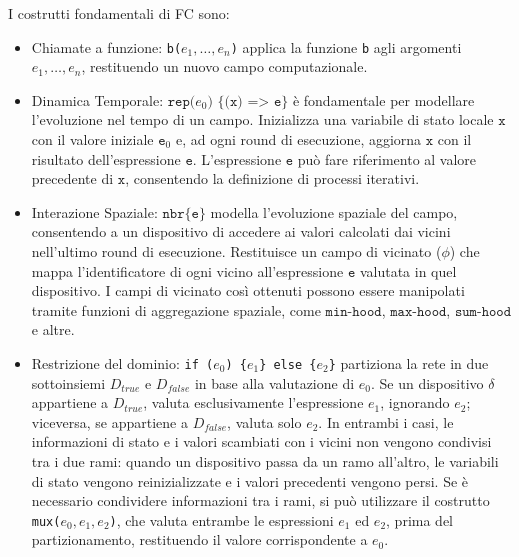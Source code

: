 I costrutti fondamentali di \ac{FC} \cite{AC} sono:
\begin{itemize}
    \item Chiamate a funzione: \texttt{b(\(e_1, \dots, e_n\))} applica la funzione \texttt{b} agli argomenti \texttt{\(e_1, \dots, e_n\)}, restituendo un nuovo campo computazionale.

    \item Dinamica Temporale: $\texttt{rep(\(e_0\)) \{(x) => e\}}$ è fondamentale per modellare l'evoluzione nel tempo di un campo. Inizializza una variabile di stato locale $\texttt{x}$ con il valore iniziale $\texttt{e}_0$ e, ad ogni round di esecuzione, aggiorna $\texttt{x}$ con il risultato dell'espressione $\texttt{e}$. L'espressione $\texttt{e}$ può fare riferimento al valore precedente di $\texttt{x}$, consentendo la definizione di processi iterativi.

    \item Interazione Spaziale: $\texttt{nbr\{e\}}$ modella l'evoluzione spaziale del campo, consentendo a un dispositivo di accedere ai valori calcolati dai vicini nell'ultimo round di esecuzione. Restituisce un campo di vicinato ($\phi$) che mappa l'identificatore di ogni vicino all'espressione $\texttt{e}$ valutata in quel dispositivo. I campi di vicinato così ottenuti possono essere manipolati tramite funzioni di aggregazione spaziale, come $\texttt{min-hood}$, $\texttt{max-hood}$, $\texttt{sum-hood}$ e altre.

    \item Restrizione del dominio: \texttt{if (\(e_0\)) \{\(e_1\)\} else \{\(e_2\)\}} partiziona la rete in due sottoinsiemi \(D_{true}\) e \(D_{false}\) in base alla valutazione di \texttt{\(e_0\)}. Se un dispositivo \(\delta\) appartiene a \(D_{true}\), valuta esclusivamente l’espressione \(e_1\), ignorando \(e_2\); viceversa, se appartiene a \(D_{false}\), valuta solo \(e_2\). In entrambi i casi, le informazioni di stato e i valori scambiati con i vicini non vengono condivisi tra i due rami: quando un dispositivo passa da un ramo all’altro, le variabili di stato vengono reinizializzate e i valori precedenti vengono persi. Se è necessario condividere informazioni tra i rami, si può utilizzare il costrutto \texttt{mux(\(e_0, e_1, e_2\))}, che valuta entrambe le espressioni \texttt{\(e_1\)} ed \texttt{\(e_2\)}, prima del partizionamento, restituendo il valore corrispondente a \texttt{\(e_0\)}.


\end{itemize}
